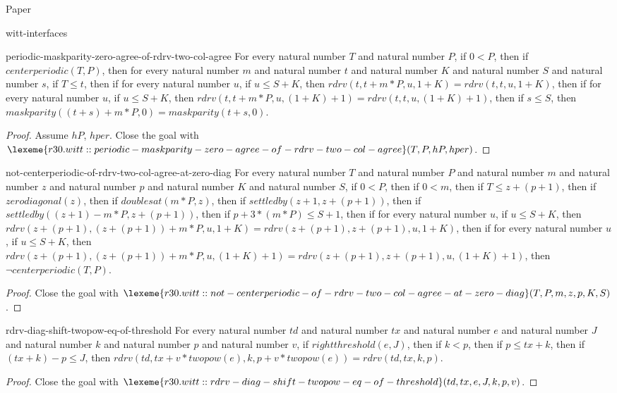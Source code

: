 \begin{lexlean}{Paper}
\begin{section}{witt-interfaces}
  \begin{theorem}{periodic-maskparity-zero-agree-of-rdrv-two-col-agree}
  For every natural number \(T\) and natural number \(P\), if \(0 < P\), then if \(centerperiodic(T, P)\), then for every natural number \(m\) and natural number \(t\) and natural number \(K\) and natural number \(S\) and natural number \(s\), if \(T ≤ t\), then if for every natural number \(u\), if \(u ≤ S + K\), then \(rdrv(t, t + m * P, u, 1 + K) = rdrv(t, t, u, 1 + K)\), then if for every natural number \(u\), if \(u ≤ S + K\), then \(rdrv(t, t + m * P, u, (1 + K) + 1) = rdrv(t, t, u, (1 + K) + 1)\), then if \(s ≤ S\), then \(maskparity((t + s) + m * P, 0) = maskparity(t + s, 0)\).
  \begin{proof}
  Assume \(hP\), \(hper\).
  Close the goal with \(\lexeme{r30.witt::periodic-maskparity-zero-agree-of-rdrv-two-col-agree}(T, P, hP, hper)\).
  \end{proof}
  \end{theorem}

  \begin{theorem}{not-centerperiodic-of-rdrv-two-col-agree-at-zero-diag}
  For every natural number \(T\) and natural number \(P\) and natural number \(m\) and natural number \(z\) and natural number \(p\) and natural number \(K\) and natural number \(S\), if \(0 < P\), then if \(0 < m\), then if \(T ≤ z + (p + 1)\), then if \(zerodiagonal(z)\), then if \(doublesat(m * P, z)\), then if \(settledby(z + 1, z + (p + 1))\), then if \(settledby((z + 1) - m * P, z + (p + 1))\), then if \(p + 3 * (m * P) ≤ S + 1\), then if for every natural number \(u\), if \(u ≤ S + K\), then \(rdrv(z + (p + 1), (z + (p + 1)) + m * P, u, 1 + K) = rdrv(z + (p + 1), z + (p + 1), u, 1 + K)\), then if for every natural number \(u\), if \(u ≤ S + K\), then \(rdrv(z + (p + 1), (z + (p + 1)) + m * P, u, (1 + K) + 1) = rdrv(z + (p + 1), z + (p + 1), u, (1 + K) + 1)\), then \(¬ centerperiodic(T, P)\).
  \begin{proof}
  Close the goal with \(\lexeme{r30.witt::not-centerperiodic-of-rdrv-two-col-agree-at-zero-diag}(T, P, m, z, p, K, S)\).
  \end{proof}
  \end{theorem}

  \begin{theorem}{rdrv-diag-shift-twopow-eq-of-threshold}
  For every natural number \(td\) and natural number \(tx\) and natural number \(e\) and natural number \(J\) and natural number \(k\) and natural number \(p\) and natural number \(v\), if \(rightthreshold(e, J)\), then if \(k < p\), then if \(p ≤ tx + k\), then if \((tx + k) - p ≤ J\), then \(rdrv(td, tx + v * twopow(e), k, p + v * twopow(e)) = rdrv(td, tx, k, p)\).
  \begin{proof}
  Close the goal with \(\lexeme{r30.witt::rdrv-diag-shift-twopow-eq-of-threshold}(td, tx, e, J, k, p, v)\).
  \end{proof}
  \end{theorem}


\end{section}
\end{lexlean}
